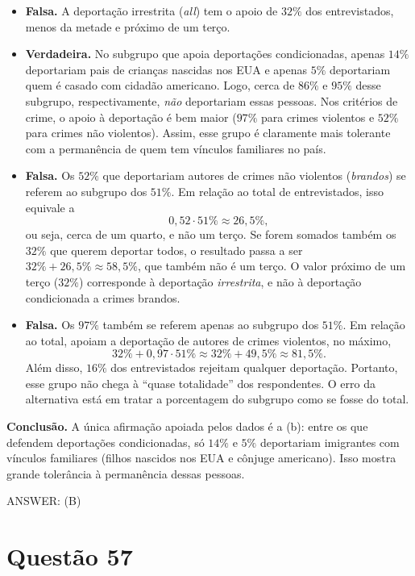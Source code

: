 \documentclass{article}%
\begin{document}
\begin{itemize}
\item[a)] \textbf{Falsa.} A deportação irrestrita (\emph{all}) tem o apoio de $32\%$ dos entrevistados, menos da metade e próximo de um terço.

\item[b)] \textbf{Verdadeira.} No subgrupo que apoia deportações condicionadas, apenas $14\%$ deportariam pais de crianças nascidas nos EUA e apenas $5\%$ deportariam quem é casado com cidadão americano. Logo, cerca de $86\%$ e $95\%$ desse subgrupo, respectivamente, \emph{não} deportariam essas pessoas. Nos critérios de crime, o apoio à deportação é bem maior ($97\%$ para crimes violentos e $52\%$ para crimes não violentos). Assim, esse grupo é claramente mais tolerante com a permanência de quem tem vínculos familiares no país.

\item[c)] \textbf{Falsa.} Os $52\%$ que deportariam autores de crimes não violentos (\emph{brandos}) se referem ao subgrupo dos $51\%$. Em relação ao total de entrevistados, isso equivale a
\[
0{,}52 \cdot 51\% \approx 26{,}5\%,
\]
ou seja, cerca de um quarto, e não um terço. Se forem somados também os $32\%$ que querem deportar todos, o resultado passa a ser $32\% + 26{,}5\% \approx 58{,}5\%$, que também não é um terço. O valor próximo de um terço ($32\%$) corresponde à deportação \emph{irrestrita}, e não à deportação condicionada a crimes brandos.

\item[d)] \textbf{Falsa.} Os $97\%$ também se referem apenas ao subgrupo dos $51\%$. Em relação ao total, apoiam a deportação de autores de crimes violentos, no máximo,
\[
32\% + 0{,}97 \cdot 51\% \approx 32\% + 49{,}5\% \approx 81{,}5\%.
\]
Além disso, $16\%$ dos entrevistados rejeitam qualquer deportação. Portanto, esse grupo não chega à ``quase totalidade'' dos respondentes. O erro da alternativa está em tratar a porcentagem do subgrupo como se fosse do total.
\end{itemize}

\textbf{Conclusão.} A única afirmação apoiada pelos dados é a (b): entre os que defendem deportações condicionadas, só $14\%$ e $5\%$ deportariam imigrantes com vínculos familiares (filhos nascidos nos EUA e cônjuge americano). Isso mostra grande tolerância à permanência dessas pessoas.

ANSWER: (B)%
\newpage%
\section*{Questão 57}
\end{document}
